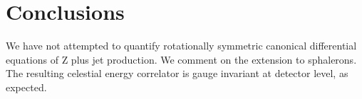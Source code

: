 \section{Conclusions}\label{sec:conclusions}

We have not attempted to quantify rotationally symmetric canonical
differential equations of Z plus jet production. We comment on the
extension to sphalerons. The resulting celestial energy correlator is
gauge invariant at detector level, as expected.

